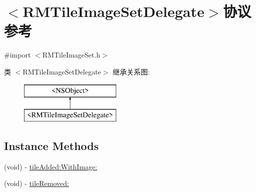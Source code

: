 \hypertarget{protocol_r_m_tile_image_set_delegate-p}{\section{$<$R\-M\-Tile\-Image\-Set\-Delegate$>$协议 参考}
\label{protocol_r_m_tile_image_set_delegate-p}
}


{\ttfamily \#import $<$R\-M\-Tile\-Image\-Set.\-h$>$}

类 $<$R\-M\-Tile\-Image\-Set\-Delegate$>$ 继承关系图\-:\begin{figure}[H]
\begin{center}
\leavevmode
\includegraphics[height=2.000000cm]{protocol_r_m_tile_image_set_delegate-p}
\end{center}
\end{figure}
\subsection*{Instance Methods}
\begin{DoxyCompactItemize}
\item 
(void) -\/ \hyperlink{protocol_r_m_tile_image_set_delegate-p_ae048b7ba154cee53ce82d213a2fce3ef}{tile\-Added\-:\-With\-Image\-:}
\item 
(void) -\/ \hyperlink{protocol_r_m_tile_image_set_delegate-p_a1bfacddc81f3ee8fd2fd08859e4dc905}{tile\-Removed\-:}
\end{DoxyCompactItemize}


